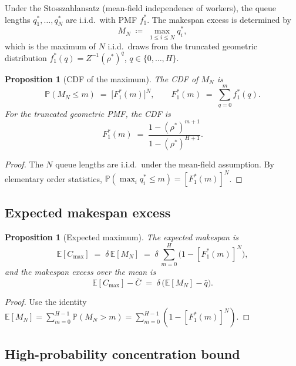 \documentclass[11pt,a4paper]{article}
\newtheorem{proposition}[theorem]{Proposition}
\newcommand{\rhostar}{\rho^{*}}
\newcommand{\qbar}{\bar{q}}
\newcommand{\Cmax}{C_{\max}}
\newcommand{\Cbar}{\bar{C}}
\begin{document}
Under the Stosszahlansatz (mean-field independence of workers), the
queue lengths $q_1^*, \ldots, q_N^*$ are i.i.d.\ with PMF $f_1^*$.
The makespan excess is determined by
\[
  M_N \;\coloneqq\; \max_{1 \leq i \leq N} q_i^*,
\]
which is the maximum of $N$ i.i.d.\ draws from the truncated geometric
distribution $f_1^*(q) = Z^{-1}(\rhostar)^q$, $q \in \{0,\ldots,H\}$.

\begin{proposition}[CDF of the maximum]
\label{prop:max-cdf}
The CDF of $M_N$ is
\begin{equation}
  \mathbb{P}(M_N \leq m)
  \;=\; \bigl[F_1^*(m)\bigr]^N,
  \qquad F_1^*(m) \;=\; \sum_{q=0}^{m} f_1^*(q).
  \label{eq:max-cdf}
\end{equation}
For the truncated geometric PMF, the CDF is
\[
  F_1^*(m) \;=\; \frac{1-(\rhostar)^{m+1}}{1-(\rhostar)^{H+1}}.
\]
\end{proposition}

\begin{proof}
The $N$ queue lengths are i.i.d.\ under the mean-field assumption.
By elementary order statistics, $\mathbb{P}(\max_i q_i^* \leq m) = [F_1^*(m)]^N$.
\end{proof}

\subsection{Expected makespan excess}

\begin{proposition}[Expected maximum]
\label{prop:exp-max}
The expected makespan is
\begin{equation}
  \mathbb{E}[\Cmax]
  \;=\; \delta\,\mathbb{E}[M_N]
  \;=\; \delta\,\sum_{m=0}^{H} \bigl(1 - [F_1^*(m)]^N\bigr),
  \label{eq:exp-cmax}
\end{equation}
and the makespan excess over the mean is
\begin{equation}
  \mathbb{E}[\Cmax] - \Cbar
  \;=\; \delta\,\bigl(\mathbb{E}[M_N] - \qbar\bigr).
  \label{eq:excess}
\end{equation}
\end{proposition}

\begin{proof}
Use the identity $\mathbb{E}[M_N] = \sum_{m=0}^{H-1} \mathbb{P}(M_N > m)
= \sum_{m=0}^{H-1}(1-[F_1^*(m)]^N)$.
\end{proof}

\subsection{High-probability concentration bound}
\end{document}
